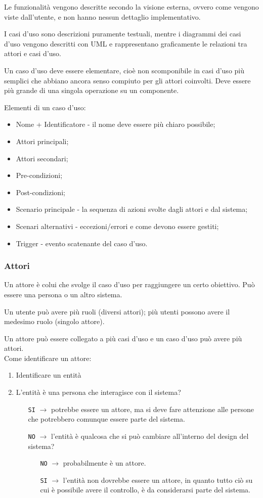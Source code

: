 Le funzionalità vengono descritte secondo la visione esterna, ovvero come vengono viste dall'utente, e non hanno nessun dettaglio implementativo.

I casi d'uso sono descrizioni puramente testuali, mentre i diagrammi dei casi d'uso vengono descritti con UML e rappresentano graficamente le relazioni tra attori e casi d'uso.

Un caso d'uso deve essere elementare, cioè non scomponibile in casi d'uso più semplici che abbiano ancora senso compiuto per gli attori coinvolti. Deve essere più grande di una singola operazione su un componente. 

Elementi di un caso d'uso:
\begin{itemize}
\item Nome + Identificatore - il nome deve essere più chiaro possibile;
\item Attori principali;
\item Attori secondari;
\item Pre-condizioni;
\item Post-condizioni; 
\item Scenario principale - la sequenza di azioni svolte dagli attori e dal sistema;
\item Scenari alternativi - eccezioni/errori e come devono essere gestiti;
\item Trigger - evento scatenante del caso d'uso.
\end{itemize}

\subsubsection{Attori}

Un attore è colui che svolge il caso d'uso per raggiungere un certo obiettivo. Può essere una persona o un altro sistema. 

Un utente può avere più ruoli (diversi attori); più utenti possono avere il medesimo ruolo (singolo attore). 

Un attore può essere collegato a più casi d'uso e un caso d'uso può avere più attori. \\
Come identificare un attore:
\begin{enumerate}
\item Identificare un entità
\item L'entità è una persona che interagisce con il sistema?
\begin{itemize}
\item[\texttt{SI}] $\to$ potrebbe essere un attore, ma si deve fare attenzione alle persone che potrebbero comunque essere parte del sistema.
\item[\texttt{NO}] $\to$ l'entità è qualcosa che si può cambiare all'interno del design del sistema?
\begin{itemize}
\item[\texttt{NO}] $\to$ probabilmente è un attore.
\item[\texttt{SI}] $\to$ l'entità non dovrebbe essere un attore, in quanto tutto ciò su cui è possibile avere il controllo, è da considerarsi parte del sistema.
\end{itemize}
\end{itemize}
\end{enumerate}

